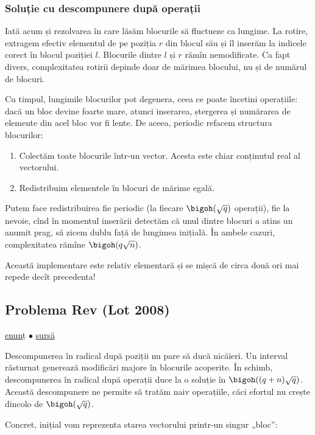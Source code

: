 \subsubsection*{Soluție cu descompunere după operații}

Iată acum și rezolvarea în care lăsăm blocurile să fluctueze ca lungime. La rotire, extragem efectiv elementul de pe poziția $r$ din blocul său și îl inserăm la indicele corect în blocul poziției $l$. Blocurile dintre $l$ și $r$ rămîn nemodificate. Ca fapt divers, complexitatea rotirii depinde doar de mărimea blocului, nu și de numărul de blocuri.

Cu timpul, lungimile blocurilor pot degenera, ceea ce poate încetini operațiile: dacă un bloc devine foarte mare, atunci inserarea, ștergerea și numărarea de elemente din acel bloc vor fi lente. De aceea, periodic refacem structura blocurilor:

\begin{enumerate}
  \item Colectăm toate blocurile într-un vector. Acesta este chiar conținutul real al vectorului.
  \item Redistribuim elementele în blocuri de mărime egală.
\end{enumerate}

Putem face redistribuirea fie periodic (la fiecare $\bigoh(\sqrt{q})$ operații), fie la nevoie, cînd în momentul inserării detectăm că unul dintre blocuri a atins un anumit prag, să zicem dublu față de lungimea inițială. În ambele cazuri, complexitatea rămîne $\bigoh(q \sqrt{n})$.

Această implementare este relativ elementară și se mișcă de circa două ori mai repede decît precedenta!

\subsection{Problema Rev (Lot 2008)}
\label{problem:rev}

\href{https://kilonova.ro/problems/2316}{enunț}
$\bullet$
\hyperref[code:rev]{sursă}

Descompunerea în radical după poziții nu pare să ducă nicăieri. Un interval răsturnat generează modificări majore în blocurile acoperite. În schimb, descompunerea în radical după operații duce la o soluție în $\bigoh((q  + n) \sqrt{q})$. Această descompunere ne permite să tratăm naiv operațiile, căci efortul nu crește dincolo de $\bigoh(\sqrt{q})$.

Concret, inițial vom reprezenta starea vectorului printr-un singur „bloc”:


